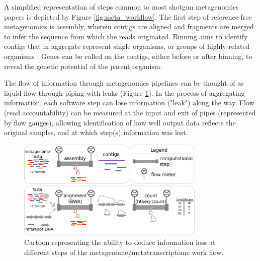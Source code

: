A simplified representation of steps common to most shotgun metagenomics papers is depicted by Figure \ref{fig:meta_workflow}.
The first step of reference-free metagenomics is assembly, wherein contigs are aligned and fragments are merged to infer the sequence from which the reads originated.
Binning aims to identify contigs that in aggregate represent single organisms, or groups of highly related organisms \cite{kunin2008}.
Genes can be called on the contigs, either before or after binning, to reveal the genetic potential of the parent organism.

The flow of information through metagenomics pipelines can be thought of as liquid flow through piping with leaks (Figure \ref{fig:pipe_leaks}).
In the process of aggregating information, each software step can lose information ("leak") along the way.
Flow (read accountability) can be measured at the input and exit of pipes (represented by flow gauges), allowing identification of how well output data reflects the original samples, and at which step(s) information was lost.

\begin{figure}[H]
\centering
    \includegraphics[width=0.8\textwidth]{./tex/chapter2/figures/170312_pipe_leaks.pdf}
    \begin{singlespace}
    \caption[Framework for assessing information loss in workflow steps]{
        Cartoon representing the ability to deduce information loss at different steps of the metagenome/metatranscriptome work flow.}
    \label{fig:pipe_leaks}
    \end{singlespace}
\end{figure}

